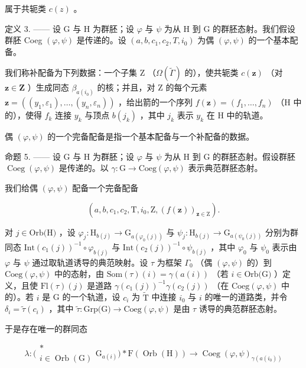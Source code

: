 属于共轭类 \(c(z)\) 。

定义 3. —— 设 G 与 H 为群胚；设 \(\varphi\) 与 \(\psi\) 为从 H 到 G 的群胚态射。我们假设群胚 Coeg \((\varphi, \psi)\) 是传递的。设 \((a, b, c_1, c_2, T, i_0)\) 为偶 \((\varphi, \psi)\) 的一个基本配备。

我们称补配备为下列数据：一个子集 Z （\(\Omega(\widetilde{\Gamma})\) 的），使共轭类 \(c(\mathbf{z})\) （对 \(\mathbf{z} \in \mathbf{Z}\) ）生成同态 \(\beta_{a(i_0)}\) 的核；并且，对 Z 的每个元素 \(\mathbf{z} = ((y_1, \varepsilon_1), \ldots, (y_n, \varepsilon_n))\) ，给出箭的一个序列 \(f(\mathbf{z}) = (f_1, \ldots, f_n)\) （H 中的），使得 \(f_k\) 连接 \(y_k\) 与顶点 \(b(j_k)\) ，其中 \(j_k\) 表示 \(y_k\) 在 H 中的轨道。

偶 \((\varphi,\psi)\) 的一个完备配备是指一个基本配备与一个补配备的数据。

命题 5. —— 设 G 与 H 为群胚；设 \(\varphi\) 与 \(\psi\) 为从 H 到 G 的群胚态射。假设群胚 \(\operatorname{Coeg}(\varphi, \psi)\) 是传递的。以 \(\gamma\colon \mathrm{G} \to \mathrm{Coeg}(\varphi, \psi)\) 表示典范群胚态射。

我们给偶 \((\varphi, \psi)\) 配备一个完备配备

\[
(a, b, c _ {1}, c _ {2}, \mathrm{T}, i _ {0}, \mathrm{Z}, (f (\mathbf {z})) _ {\mathbf {z} \in \mathrm{Z}}).
\]

对 \(j \in \text{Orb(H)}\) ，设 \(\varphi_j \colon \text{H}_{b(j)} \to \text{G}_{a(\varphi_0(j))}\) 与 \(\psi_j \colon \text{H}_{b(j)} \to \text{G}_{a(\psi_0(j))}\) 分别为群同态 \(\text{Int}(c_1(j))^{-1} \circ \varphi_{b(j)}\) 与 \(\text{Int}(c_2(j))^{-1} \circ \psi_{b(j)}\) ，其中 \(\varphi_0\) 与 \(\psi_0\) 表示由 \(\varphi\) 与 \(\psi\) 通过取轨道诱导的典范映射。设 \(\tau\) 为框架 \(\Gamma_0\) （偶 \((\varphi, \psi)\) 的）到 \(\text{Coeg}(\varphi, \psi)\) 中的态射，由 \(\text{Som}(\tau)(i) = \gamma(a(i))\) （若 \(i \in \text{Orb(G)}\) ）定义，且使 \(\text{Fl}(\tau)(j)\) 是道路 \(\gamma(c_1(j))^{-1} \gamma(c_2(j))\) （在 \(\text{Coeg}(\varphi, \psi)\) 中的）。若 \(i\) 是 G 的一个轨道，设 \(c_i\) 为 \(\widetilde{\text{T}}\) 中连接 \(i_0\) 与 \(i\) 的唯一的道路类，并令 \(\delta_i = \widetilde{\tau}(c_i)\) ，其中 \(\widetilde{\tau} \colon \text{Grp(G)} \to \text{Coeg}(\varphi, \psi)\) 是由 \(\tau\) 诱导的典范群胚态射。

于是存在唯一的群同态

\[
\lambda \colon \bigl ( \begin{array}{c} * \\ i \in \operatorname{Orb} (\mathrm{G}) \end{array} \mathrm{G} _ {a (i)} \bigr) * \mathrm{F} (\operatorname{Orb} (\mathrm{H})) \to \operatorname{Coeg} (\varphi , \psi) _ {\gamma (a (i _ {0}))}
\]

